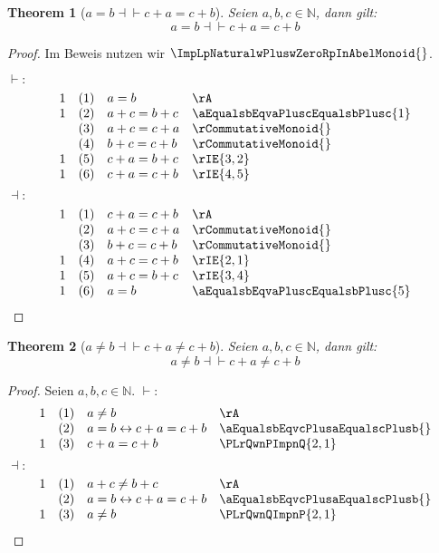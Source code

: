 \documentclass{book}
\theoremstyle{plain}
\newtheorem{theorem}{Theorem}
\theoremstyle{remark}
\theoremstyle{definition}
\begin{document}
\label{aEqualsbEqvcPlusaEqualscPlusb}
\begin{theorem}[\(a=b\dashv \vdash c+a=c+b\)]
Seien \(a,b,c\in\mathbb{N}\), dann gilt:
\[a=b\dashv\vdash c+a=c+b\]
\end{theorem}
\begin{proof}
Im Beweis nutzen wir \(\ImpLpNaturalwPluswZeroRpInAbelMonoid{}\).

\(\vdash:\)
    \[
	\begin{array}{llll}
            1       &  (1)  & a=b & \rA \\
            1       &  (2)  & a+c=b+c & \aEqualsbEqvaPluscEqualsbPlusc{1} \\
                    &  (3)  & a+c=c+a & \rCommutativeMonoid{} \\     
                    &  (4)  & b+c=c+b & \rCommutativeMonoid{} \\ 
            1       &  (5)  & c+a=b+c & \rIE{3,2} \\
            1       &  (6)  & c+a=c+b & \rIE{4,5} \\        
	\end{array}
	\]
 \(\dashv:\)
    \[
	\begin{array}{llll}
            1       &  (1)  & c+a=c+b & \rA \\
                    &  (2)  & a+c=c+a & \rCommutativeMonoid{} \\     
                    &  (3)  & b+c=c+b & \rCommutativeMonoid{} \\ 
            1       &  (4)  & a+c=c+b & \rIE{2,1} \\
            1       &  (5)  & a+c=b+c & \rIE{3,4} \\        
            1       &  (6)  & a=b & \aEqualsbEqvaPluscEqualsbPlusc{5} \\        
	\end{array}
	\]
\end{proof}

\label{aNotEqualsbEqvcPlusaNotEqualscPlusb}
\begin{theorem}[\(a\neq b\dashv \vdash c+a\neq c+b\)]
Seien \(a,b,c\in\mathbb{N}\), dann gilt:
\[a\neq b\dashv\vdash c+a\neq c+b\]
\end{theorem}
\begin{proof}
Seien \(a,b,c\in\mathbb{N}\).
\(\vdash:\)
        \[
	\begin{array}{llll}
            1       &  (1)  & a\neq b & \rA \\
                    &  (2)  & a=b\leftrightarrow c+a=c+b & \aEqualsbEqvcPlusaEqualscPlusb{} \\
            1       &  (3)  & c+a=c+b & \PLrQwnPImpnQ{2,1} \\       
	\end{array}
	\]
 \(\dashv:\)
        \[
	\begin{array}{llll}
            1       &  (1)  & a+c\neq b+c & \rA \\
                    &  (2)  & a=b\leftrightarrow c+a=c+b & \aEqualsbEqvcPlusaEqualscPlusb{} \\
            1       &  (3)  & a\neq b & \PLrQwnQImpnP{2,1} \\    
	\end{array}
	\]
\end{proof}
\end{document}
